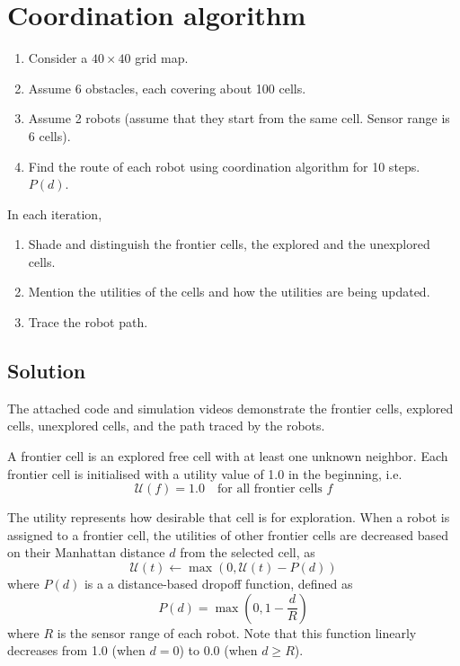 \section*{Coordination algorithm}

\begin{enumerate}[noitemsep, leftmargin=0.5cm]
    \item Consider a \( 40 \times 40 \) grid map.

    \item Assume 6 obstacles, each covering about 100 cells.

    \item Assume 2 robots (assume that they start from the same cell. Sensor range is 6 cells).

    \item Find the route of each robot using coordination algorithm for 10 steps. \( P(d) \).
\end{enumerate}
In each iteration,
\begin{enumerate}[noitemsep]
    \item Shade and distinguish the frontier cells, the explored and the unexplored cells.

    \item Mention the utilities of the cells and how the utilities are being updated.

    \item Trace the robot path.
\end{enumerate}

\subsection*{Solution}

The attached code and simulation videos demonstrate the frontier cells, explored cells, unexplored cells, and the path traced by the robots.

A frontier cell is an explored free cell with at least one unknown neighbor.
Each frontier cell is initialised with a utility value of 1.0 in the beginning, i.e.
\begin{equation*}
    \mathcal{U}(f) = 1.0 \quad \text{for all frontier cells } f
\end{equation*}

The utility represents how desirable that cell is for exploration.
When a robot is assigned to a frontier cell, the utilities of other frontier cells are decreased based on their Manhattan distance \( d \) from the selected cell, as
\begin{equation*}
    \mathcal{U}(t) \gets \max\left(0, \mathcal{U}(t) - P(d)\right)
\end{equation*}
where \( P(d) \) is a a distance-based dropoff function, defined as
\begin{equation*}
    P(d) = \max\left(0, 1 - \frac{d}{R}\right)
\end{equation*}
where \( R \) is the sensor range of each robot.
Note that this function linearly decreases from 1.0 (when \( d = 0 \)) to 0.0 (when \( d \geq R \)).

